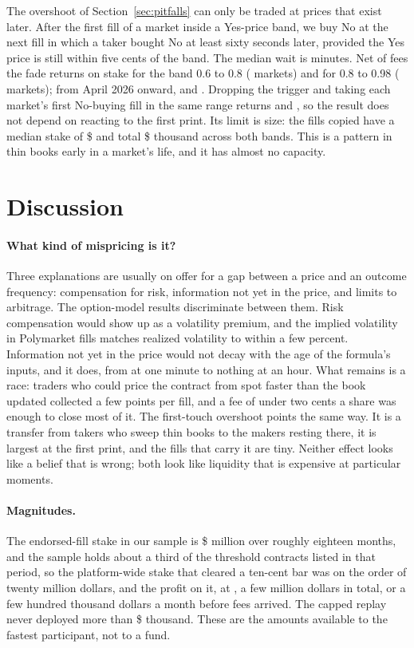 \documentclass[format=acmsmall, review=false]{acmart}
\begin{document}
The overshoot of Section~\ref{sec:pitfalls} can only be traded at prices that exist later. After the first fill of a market inside a Yes-price band, we buy No at the next fill in which a taker bought No at least sixty seconds later, provided the Yes price is still within five cents of the band. The median wait is \fadeWait{} minutes. Net of fees the fade returns \fadeMid{} on stake for the band 0.6 to 0.8 (\fadeMidN{} markets) and \fadeHigh{} for 0.8 to 0.98 (\fadeHighN{} markets); from April 2026 onward, \fadeMidLate{} and \fadeHighLate{}. Dropping the trigger and taking each market's first No-buying fill in the same range returns \fadeMidBase{} and \fadeHighBase{}, so the result does not depend on reacting to the first print. Its limit is size: the fills copied have a median stake of \$\fadeFillUsd{} and total \$\fadeTotalK{} thousand across both bands. This is a pattern in thin books early in a market's life, and it has almost no capacity.

\section{Discussion}\label{sec:discussion}

\paragraph{What kind of mispricing is it?} Three explanations are usually on offer for a gap between a price and an outcome frequency: compensation for risk, information not yet in the price, and limits to arbitrage. The option-model results discriminate between them. Risk compensation would show up as a volatility premium, and the implied volatility in Polymarket fills matches realized volatility to within a few percent. Information not yet in the price would not decay with the age of the formula's inputs, and it does, from \backedOne{} at one minute to nothing at an hour. What remains is a race: traders who could price the contract from spot faster than the book updated collected a few points per fill, and a fee of under two cents a share was enough to close most of it. The first-touch overshoot points the same way. It is a transfer from takers who sweep thin books to the makers resting there, it is largest at the first print, and the fills that carry it are tiny. Neither effect looks like a belief that is wrong; both look like liquidity that is expensive at particular moments.

\paragraph{Magnitudes.} The endorsed-fill stake in our sample is \$\backedStakeM{} million over roughly eighteen months, and the sample holds about a third of the threshold contracts listed in that period, so the platform-wide stake that cleared a ten-cent bar was on the order of twenty million dollars, and the profit on it, at \backedOne{}, a few million dollars in total, or a few hundred thousand dollars a month before fees arrived. The capped replay never deployed more than \$\replayCapitalK{} thousand. These are the amounts available to the fastest participant, not to a fund.
\end{document}
